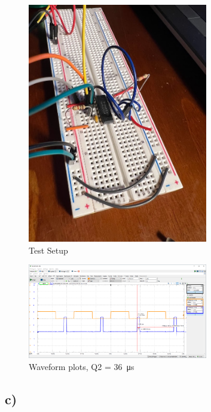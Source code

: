 \documentclass{article}
\begin{document}
	\begin{figure}[H]
	    \centering
	    \includegraphics[width=0.7\textwidth]{3b-setup}
	    \caption{Test Setup}
	\end{figure}
	
	\begin{figure}[H]
	    \centering
	    \includegraphics[width=0.7\textwidth]{3b}
	    \caption{Waveform plots, Q2 = \SI{36}{\micro\second}}
	\end{figure}
	
	\subsection*{c)}
\end{document}
